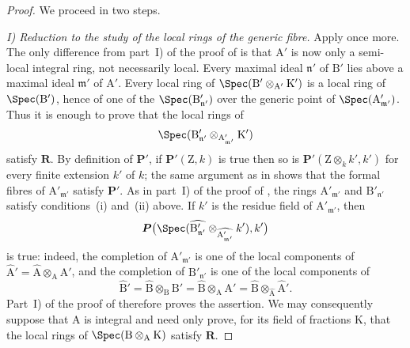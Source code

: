 \begin{proof}
We proceed in two steps.

\emph{I) Reduction to the study of the local rings of the generic fibre.} Apply  once more. The only difference from part~I) of the proof of  is that $\mathrm{A}'$ is now only a semi-local integral ring, not necessarily local. Every maximal ideal $\mathfrak{n}'$ of $\mathrm{B}'$ lies above a maximal ideal $\mathfrak{m}'$ of $\mathrm{A}'$. Every local ring of $\Spec(\mathrm{B}'\otimes_{\mathrm{A}'}\mathrm{K}')$ is a local ring of $\Spec(\mathrm{B}')$, hence of one of the $\Spec(\mathrm{B}'_{\mathfrak{n}'})$ over the generic point of $\Spec(\mathrm{A}'_{\mathfrak{m}'})$. Thus it is enough to prove that the local rings of
\[
  \Spec(\mathrm{B}'_{\mathfrak{n}'}\otimes_{\mathrm{A}'_{\mathfrak{m}'}}\mathrm{K}')
\]
satisfy $\boldsymbol{R}$. By definition of $\boldsymbol{P}'$, if $\boldsymbol{P}'(\mathrm{Z},k)$ is true then so is $\boldsymbol{P}'(\mathrm{Z}\otimes_k k',k')$ for every finite extension $k'$ of $k$; the same argument as in  shows that the formal fibres of $\mathrm{A}'_{\mathfrak{m}'}$ satisfy $\boldsymbol{P}'$. As in part~I) of the proof of , the rings $\mathrm{A}'_{\mathfrak{m}'}$ and $\mathrm{B}'_{\mathfrak{n}'}$ satisfy conditions~(i) and~(ii) above. If $k'$ is the residue field of $\mathrm{A}'_{\mathfrak{m}'}$, then
\[
  \boldsymbol{P}\bigl(\Spec(\widehat{\mathrm{B}'_{\mathfrak{n}'}}\otimes_{\widehat{\mathrm{A}'_{\mathfrak{m}'}}}k'),k'\bigr)
\]
is true: indeed, the completion of $\mathrm{A}'_{\mathfrak{m}'}$ is one of the local components of $\widehat{\mathrm{A}}'=\widehat{\mathrm{A}}\otimes_\mathrm{A}\mathrm{A}'$, and the completion of $\mathrm{B}'_{\mathfrak{n}'}$ is one of the local components of
\[
  \widehat{\mathrm{B}}'=\widehat{\mathrm{B}}\otimes_\mathrm{B}\mathrm{B}'
  =\widehat{\mathrm{B}}\otimes_\mathrm{A}\mathrm{A}'
  =\widehat{\mathrm{B}}\otimes_{\widehat{\mathrm{A}}}\widehat{\mathrm{A}}'.
\]
Part~I) of the proof of  therefore proves the assertion. We may consequently suppose that $\mathrm{A}$ is integral and need only prove, for its field of fractions $\mathrm{K}$, that the local rings of $\Spec(\mathrm{B}\otimes_\mathrm{A}\mathrm{K})$ satisfy $\boldsymbol{R}$.


\end{proof}
